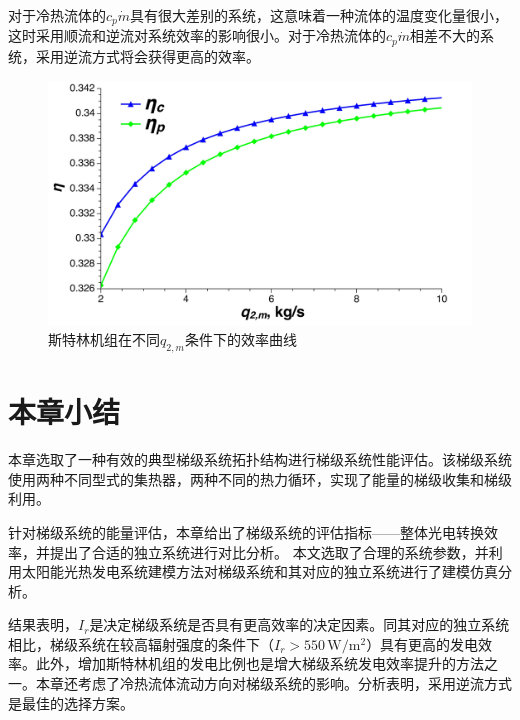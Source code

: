 
对于冷热流体的$c_p\dot{m}$具有很大差别的系统，这意味着一种流体的温度变化量很小，这时采用顺流和逆流对系统效率的影响很小。对于冷热流体的$c_p\dot{m}$相差不大的系统，采用逆流方式将会获得更高的效率。

\noindent \begin{figure}[H]
\begin{center}
	\includegraphics[width = 0.8\columnwidth, angle = 0]{fig/SEAflowtypes}
	\caption{斯特林机组在不同$q_{2,m}$条件下的效率曲线}
	\label{fig:SEAflowtypes}
\end{center}
\end{figure}

\section{本章小结}

本章选取了一种有效的典型梯级系统拓扑结构进行梯级系统性能评估。该梯级系统使用两种不同型式的集热器，两种不同的热力循环，实现了能量的梯级收集和梯级利用。

针对梯级系统的能量评估，本章给出了梯级系统的评估指标——整体光电转换效率，并提出了合适的独立系统进行对比分析。
本文选取了合理的系统参数，并利用太阳能光热发电系统建模方法对梯级系统和其对应的独立系统进行了建模仿真分析。

结果表明，$I_r$是决定梯级系统是否具有更高效率的决定因素。同其对应的独立系统相比，梯级系统在较高辐射强度的条件下（$I_r > 550\,\mathrm{W/m^2}$）具有更高的发电效率。此外，增加斯特林机组的发电比例也是增大梯级系统发电效率提升的方法之一。本章还考虑了冷热流体流动方向对梯级系统的影响。分析表明，采用逆流方式是最佳的选择方案。

